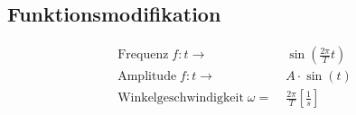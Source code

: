 \subsection{Funktionsmodifikation}
    \vspace*{-1em}
    \begin{align*}
        \text{Frequenz} \; f: t \rightarrow& \; \sin(\frac{2 \pi}{T} t)\\
        \text{Amplitude} \; f: t \rightarrow& \; A \cdot \sin(t)\\
        \text{Winkelgeschwindigkeit} \; \omega =& \; \frac{2 \pi}{T} \left[\frac{1}{s}\right]
    \end{align*}
    \vspace*{0.5em}